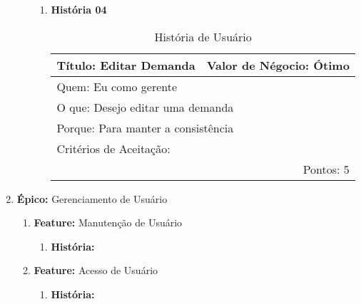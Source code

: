 \begin{enumerate}
\begin{enumerate}
\begin{enumerate}
						\item \textbf{História 04}
						\begin{table}[H]
							\begin{tabular}{|p{10cm}|l|}
								\hline 
								Título: Editar Demanda & Valor de Négocio: Ótimo\tabularnewline
								\hline 
								\multicolumn{2}{|l|}{Quem: Eu como gerente}\tabularnewline
								\hline 
								\multicolumn{2}{|l|}{O que: Desejo editar uma demanda}\tabularnewline
								\hline 
								\multicolumn{2}{|l|}{Porque: Para manter a consistência}\tabularnewline
								\hline 
								\multicolumn{2}{|l|}{Critérios de Aceitação:}
								\tabularnewline
								\hline 
								\multicolumn{2}{|r|}{Pontos: 5}\tabularnewline
								\hline 
							\end{tabular}
							\caption{História de Usuário}
							\label{Historia_de_Usuario}
						\end{table}
				\end{enumerate}
		\end{enumerate}
	\item \textbf{Épico:} Gerenciamento de Usuário
		\begin{enumerate}
			\item \textbf{Feature:} Manutenção de Usuário
				\begin{enumerate}
					\item \textbf{História:} 
				\end{enumerate}
			\item \textbf{Feature:} Acesso de Usuário
				\begin{enumerate}
					\item \textbf{História:} 
				\end{enumerate}
		\end{enumerate}
\end{enumerate}